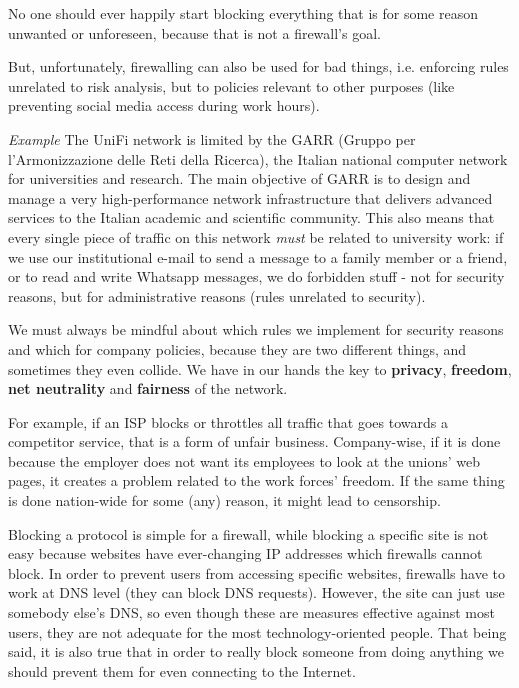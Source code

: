 No one should ever happily start blocking everything that is for some reason unwanted or unforeseen, because that is not a firewall's goal.

But, unfortunately, firewalling can also be used for bad things, i.e. enforcing rules unrelated to risk analysis, but to policies relevant to other purposes (like preventing social media access during work hours).

\vspace{0.5em}

\emph{Example} The UniFi network is limited by the GARR (Gruppo per l'Armonizzazione delle Reti della Ricerca), the Italian national computer network for universities and research. The main objective of GARR is to design and manage a very high-performance network infrastructure that delivers advanced services to the Italian academic and scientific community. This also means that every single piece of traffic on this network \textit{must} be related to university work: if we use our institutional e-mail to send a message to a family member or a friend, or to read and write Whatsapp messages, we do forbidden stuff - not for security reasons, but for administrative reasons (rules unrelated to security).

\vspace{0.5em}

We must always be mindful about which rules we implement for security reasons and which for company policies, because they are two different things, and sometimes they even collide. We have in our hands the key to \textbf{privacy}, \textbf{freedom}, \textbf{net neutrality} and \textbf{fairness} of the network.

For example, if an ISP blocks or throttles all traffic that goes towards a competitor service, that is a form of unfair business. Company-wise, if it is done because the employer does not want its employees to look at the unions' web pages, it creates a problem related to the work forces' freedom. If the same thing is done nation-wide for some (any) reason, it might lead to censorship.

Blocking a protocol is simple for a firewall, while blocking a specific site is not easy because websites have ever-changing IP addresses which firewalls cannot block. In order to prevent users from accessing specific websites, firewalls have to work at DNS level (they can block DNS requests). However, the site can just use somebody else's DNS, so even though these are measures effective against most users, they are not adequate for the most technology-oriented people. That being said, it is also true that in order to really block someone from doing anything we should prevent them for even connecting to the Internet.

